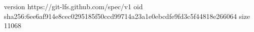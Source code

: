 version https://git-lfs.github.com/spec/v1
oid sha256:6ee6af914e8cec0295185f50ccd99714a23a1e0ebcdfe9fd3c5f44818e266064
size 11068

